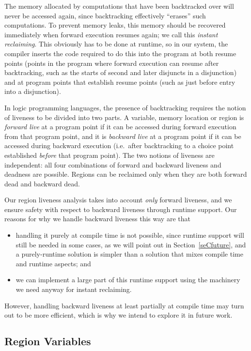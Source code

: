 \documentclass{tlp}
\begin{document}
The memory allocated by computations that have been backtracked over
will never be accessed again,
since backtracking effectively ``erases'' such computations.
To prevent memory leaks, this memory should be recovered
immediately when forward execution resumes again;
we call this \emph{instant reclaiming}.
This obviously has to be done at runtime,
so in our system,
the compiler inserts the code required to do this into the program
at both resume points
(points in the program where forward execution can resume after backtracking,
such as the starts of second and later disjuncts in a disjunction)
and at program points that establish resume points
(such as just before entry into a disjunction).

In logic programming languages, the presence of backtracking
requires the notion of liveness to be divided into two parts.
A variable, memory location or region
is \emph{forward live} at a program point
if it can be accessed during forward execution from that program point,
and it is \emph{backward live} at a program point
if it can be accessed during backward execution (i.e.\ after backtracking
to a choice point established \emph{before} that program point).
The two notions of liveness are independent:
all four combinations of forward and backward liveness and deadness
are possible.
Regions can be reclaimed only
when they are both forward dead and backward dead.

Our region liveness analysis takes into account \emph{only} forward liveness,
and we ensure safety with respect to backward liveness through runtime support.
Our reasons for why we handle backward liveness this way are that
\begin{itemize}
\item
handling it purely at compile time is not possible,
since runtime support will still be needed in some cases,
as we will point out in Section~\ref{seCfuture},
and a purely-runtime solution is simpler than a solution that mixes
compile time and runtime aspects; and
\item
we can implement a large part of this runtime support
using the machinery we need anyway for instant reclaiming.
\end{itemize}
However, handling backward liveness at least partially at compile time
may turn out to be more efficient,
which is why we intend to explore it in future work.

\subsection{Region Variables}
\end{document}
